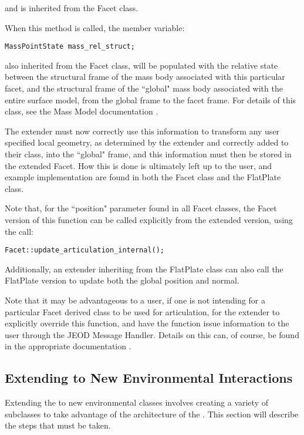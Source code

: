 and is inherited from the Facet class.

When this method is called, the member variable:

\begin{verbatim}
MassPointState mass_rel_struct;
\end{verbatim}

also inherited from the Facet class, will be populated with the relative state between the
structural frame of the mass body associated
with this particular facet, and the structural frame of the ``global" mass body associated with
the entire surface model, from the global frame to the facet frame. For details of this class,
see the Mass Model documentation \cite{dynenv:MASS}.

The extender must now correctly use this information to transform any user specified local geometry, as determined
by the extender and correctly added to their class, into the ``global" frame, and this information must then be
stored in the extended Facet. How this is done is ultimately left up to the user, and example implementation are found
in both the Facet class and the FlatPlate class.

Note that, for the ``position" parameter found in all Facet classes, the Facet version of this function can be called
explicitly from the extended version, using the call:

\begin{verbatim}
Facet::update_articulation_internal();
\end{verbatim}

Additionally, an extender inheriting from the FlatPlate class can also call the FlatPlate version to update both the global position
and normal.

Note that it may be advantageous to a user, if one is not intending for a particular Facet derived class to be used for articulation,
for the extender to explicitly override this function, and have the function issue information to the user through the JEOD
Message Handler. Details on this can, of course, be found in the appropriate documentation \cite{dynenv:MESSAGE}.

\subsection{Extending to New Environmental Interactions}

Extending the \ModelDesc to new environmental classes involves creating
a variety of subclasses to take advantage of the architecture of the
\ModelDesc. This section will describe the steps that must be taken.

